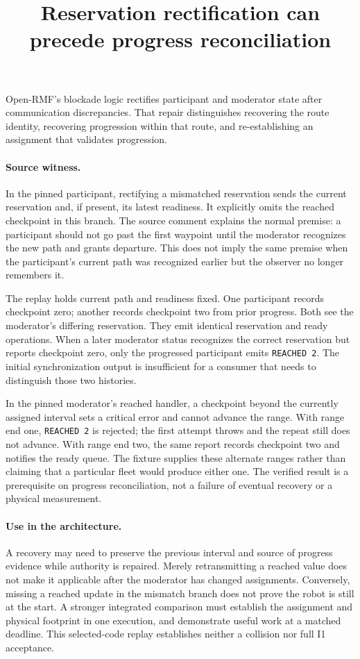 \documentclass[11pt]{article}
\title{Reservation rectification can precede progress reconciliation}
\begin{document}
\maketitle

Open-RMF's blockade logic rectifies participant and moderator
state after communication discrepancies. That repair distinguishes
recovering the route identity, recovering progression within that
route, and re-establishing an assignment that validates progression.

\paragraph{Source witness.}
In the pinned participant, rectifying a mismatched reservation
sends the current reservation and, if present, its latest readiness.
It explicitly omits the reached checkpoint in this branch. The
source comment explains the normal premise: a participant should
not go past the first waypoint until the moderator recognizes the
new path and grants departure. This does not imply the same premise
when the participant's current path was recognized earlier but
the observer no longer remembers it.

The replay holds current path and readiness fixed. One participant
records checkpoint zero; another records checkpoint two from prior
progress. Both see the moderator's differing reservation. They
emit identical reservation and ready operations. When a later
moderator status recognizes the correct reservation but reports
checkpoint zero, only the progressed participant emits
\texttt{REACHED 2}. The initial synchronization output is insufficient
for a consumer that needs to distinguish those two histories.

In the pinned moderator's reached handler, a checkpoint beyond
the currently assigned interval sets a critical error and cannot
advance the range. With range end one, \texttt{REACHED 2} is rejected;
the first attempt throws and the repeat still does not advance.
With range end two, the same report records checkpoint two and
notifies the ready queue. The fixture supplies these alternate ranges
rather than claiming that a particular fleet would produce either
one. The verified result is a prerequisite on progress reconciliation,
not a failure of eventual recovery or a physical measurement.

\paragraph{Use in the architecture.}
A recovery may need to preserve the previous interval and source
of progress evidence while authority is repaired. Merely retransmitting
a reached value does not make it applicable after the moderator
has changed assignments. Conversely, missing a reached update in
the mismatch branch does not prove the robot is still at the start.
A stronger integrated comparison must establish the assignment and
physical footprint in one execution, and demonstrate useful work at a
matched deadline. This selected-code replay establishes neither
a collision nor full I1 acceptance.
\end{document}
